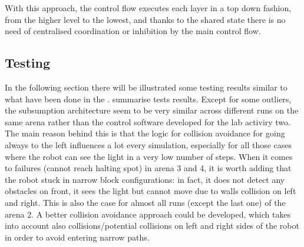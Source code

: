 \bigskip
With this approach, the control flow executes each layer in a top down fashion,
from the higher level to the lowest, and thanks to the shared state there is no
need of centralised coordination or inhibition by the main control flow.

\subsection{Testing}
In the following section there will be illustrated some testing results similar
to what have been done in the .
 summarise tests results. Except for some
outliers, the subsumption architecture seem to be very similar across different
runs on the same arena rather than the control software developed for the lab
activiry two. The main reason behind this is that the logic for collision
avoidance for going always to the left influences a lot every simulation,
especially for all those cases where the robot can see the light in a very low
number of steps. When it comes to failures (cannot reach halting spot) in arena
3 and 4, it is worth adding that the robot stuck in narrow block
configurations: in fact, it does not detect any obstacles on front, it sees the
light but cannot move due to walls collision on left and right. This is also
the case for almost all runs (except the last one) of the arena 2. A better
collision avoidance approach could be developed, which takes into account also
collisions/potential collisions on left and right sides of the robot in order
to avoid entering narrow paths.

